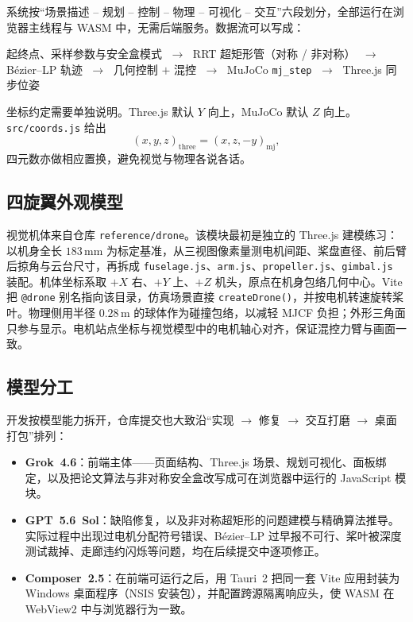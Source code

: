 \documentclass[UTF8,a4paper,11pt,zihao=-4]{ctexart}
\begin{document}
系统按``场景描述 -- 规划 -- 控制 -- 物理 -- 可视化 -- 交互''六段划分，全部运行在浏览器主线程与 WASM 中，无需后端服务。数据流可以写成：

\begin{center}
\small
起终点、采样参数与安全盒模式
$\;\rightarrow\;$
RRT 超矩形管（对称 / 非对称）
$\;\rightarrow\;$
B\'ezier--LP 轨迹
$\;\rightarrow\;$
几何控制 $+$ 混控
$\;\rightarrow\;$
MuJoCo \texttt{mj\_step}
$\;\rightarrow\;$
Three.js 同步位姿
\end{center}

坐标约定需要单独说明。Three.js 默认 $Y$ 向上，MuJoCo 默认 $Z$ 向上。\texttt{src/coords.js} 给出
\[
(x,y,z)_{\mathrm{three}}=(x,z,-y)_{\mathrm{mj}},
\]
四元数亦做相应置换，避免视觉与物理各说各话。

\subsection{四旋翼外观模型}

视觉机体来自仓库 \texttt{reference/drone}。该模块最初是独立的 Three.js 建模练习：以机身全长 $183\,\mathrm{mm}$ 为标定基准，从三视图像素量测电机间距、桨盘直径、前后臂后掠角与云台尺寸，再拆成 \texttt{fuselage.js}、\texttt{arm.js}、\texttt{propeller.js}、\texttt{gimbal.js} 装配。机体坐标系取 $+X$ 右、$+Y$ 上、$+Z$ 机头，原点在机身包络几何中心。Vite 把 \texttt{@drone} 别名指向该目录，仿真场景直接 \texttt{createDrone()}，并按电机转速旋转桨叶。物理侧用半径 $0.28\,\mathrm{m}$ 的球体作为碰撞包络，以减轻 MJCF 负担；外形三角面只参与显示。电机站点坐标与视觉模型中的电机轴心对齐，保证混控力臂与画面一致。

\subsection{模型分工}

开发按模型能力拆开，仓库提交也大致沿``实现 $\rightarrow$ 修复 $\rightarrow$ 交互打磨 $\rightarrow$ 桌面打包''排列：

\begin{itemize}
  \item \textbf{Grok~4.6}：前端主体——页面结构、Three.js 场景、规划可视化、面板绑定，以及把论文算法与非对称安全盒改写成可在浏览器中运行的 JavaScript 模块。
  \item \textbf{GPT~5.6~Sol}：缺陷修复，以及非对称超矩形的问题建模与精确算法推导\cite{zhu2026asymmetric}。实际过程中出现过电机分配符号错误、B\'ezier--LP 过早报不可行、桨叶被深度测试裁掉、走廊违约闪烁等问题，均在后续提交中逐项修正。
  \item \textbf{Composer~2.5}：在前端可运行之后，用 Tauri~2 把同一套 Vite 应用封装为 Windows 桌面程序（NSIS 安装包），并配置跨源隔离响应头，使 WASM 在 WebView2 中与浏览器行为一致。
\end{itemize}
\end{document}
